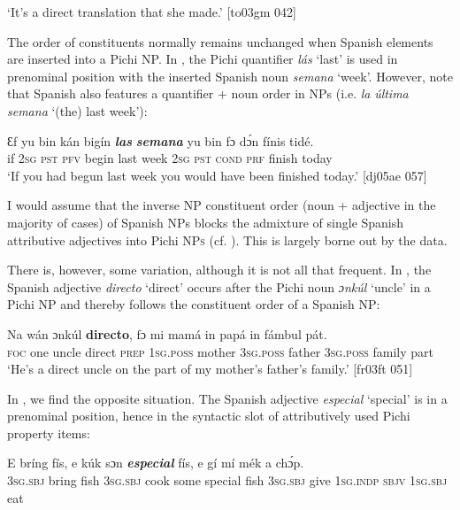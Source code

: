 \glt ‘It’s a direct translation that she made.’ [to03gm 042]
\z

The order of constituents normally remains unchanged when Spanish elements are inserted into a Pichi NP. In , the Pichi quantifier \textit{lás} ‘last’ is used in prenominal position with the inserted Spanish noun \textit{semana} ‘week’. However, note that Spanish also features a quantifier + noun order in NPs (i.e. \textit{la} \textit{última} \textit{semana} ‘(the) last week’):


\ea%
    \label{ex:key:1703}
    \gll Ɛf  yu  bin  kán  bigín  \textbf{\textit{las}}  \textbf{\textit{semana}}  yu  bin  fɔ    dɔ́n  fínis    tidé.\\
if  \textsc{2sg}  \textsc{pst}  \textsc{pfv}  begin  last  week  \textsc{2sg}  \textsc{pst}  \textsc{cond}    \textsc{prf}  finish  today\\

\glt ‘If you had begun last week you would have been finished today.’ [dj05ae 057] 
\z

I would assume that the inverse \textsc{NP} constituent order (noun + adjective in the majority of cases) of Spanish NPs blocks the admixture of single Spanish attributive adjectives into Pichi \textsc{NPs} (cf. \citealt{SankoffPoplack1981}). This is largely borne out by the data.


There is, however, some variation, although it is not all that frequent. In , the Spanish adjective \textit{directo} ‘direct’ occurs after the Pichi noun \textit{ɔnkúl} ‘uncle’\textit{} in a Pichi NP and thereby follows the constituent order of a Spanish \textsc{NP}:



\ea%
    \label{ex:key:1704}
    \gll Na  wán    ɔnkúl   \textbf{directo},  fɔ  mi    mamá  in    papá
in    fámbul  pát.\\
\textsc{foc}  one    uncle  direct  \textsc{prep}  \textsc{1sg.poss}  mother  \textsc{3sg.poss}  father
\textsc{3sg.poss}  family  part\\

\glt ‘He’s a direct uncle on the part of my mother’s father’s family.’ [fr03ft 051]
\z

In , we find the opposite situation. The Spanish adjective \textit{especial} ‘special’ is in a prenominal position, hence in the syntactic slot of attributively used Pichi property items: 


\ea%
    \label{ex:key:1705}
    \gll E    bríng  fís,  e    kúk    sɔn    \textbf{\textit{especial}}  fís,
e    gí  mí    mék    a    chɔ́p.\\
\textsc{3sg.sbj}  bring  fish  \textsc{3sg.sbj}  cook  some  special  fish
\textsc{3sg.sbj}  give  \textsc{1sg.indp}  \textsc{sbjv}    \textsc{1sg.sbj}  eat\\

